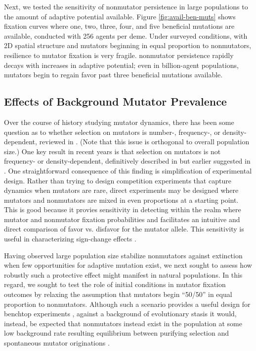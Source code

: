 

Next, we tested the sensitivity of nonmutator persistence in large populations to the amount of adaptive potential available.
Figure \ref{fig:avail-ben-muts} shows fixation curves where one, two, three, four, and five beneficial mutations are available, conducted with 256 agents per deme.
Under surveyed conditions, with 2D spatial structure and mutators beginning in equal proportion to nonmutators, resilience to mutator fixation is very fragile.
nonmutator persistence rapidly decays with increases in adaptive potential;
even in billion-agent populations, mutators begin to regain favor past three beneficial mutations available.



\subsection{Effects of Background Mutator Prevalence}
\label{sec:background-hypermutator-prevalence}

Over the course of history studying mutator dynamics, there has been some question as to whether selection on mutators is number-, frequency-, or density-dependent, reviewed in \citep{raynes2019selection}.
(Note that this issue is orthogonal to overall population size.)
One key result in recent years is that selection on mutators is not frequency- or density-dependent, definitively described in \citep{raynes2019selection} but earlier suggested in \citep{wylie2009fixation}.
One straightforward consequence of this finding is simplification of experimental design.
Rather than trying to design competition experiments that capture dynamics when mutators are rare, direct experiments may be designed where mutators and nonmutators are mixed in even proportions at a starting point.
This is good because it provies sensitivity in detecting within the realm where mutator and nonmutator fixation probabilities and facilitates an intuitive and direct comparison of favor vs. disfavor for the mutator allele.
This sensitivity is useful in characterizing sign-change effects \citep{raynes2018selection}.



Having observed large population size stabilize nonmutators against extinction when few opportunities for adaptive mutation exist, we next sought to assess how robustly such a protective effect might manifest in natural populations.
In this regard, we sought to test the role of initial conditions in mutator fixation outcomes by relaxing the assumption that mutators begin ``50/50'' in equal proportion to nonmutators.
Although such a scenario provides a useful design for benchtop experiments \citep{raynes2018sign}, against a background of evolutionary stasis it would, instead, be expected that nonmutators instead exist in the population at some low background rate resulting equilibrium between purifying selection and spontaneous mutator originations \citep{desai2011balance,johnson1999approach}.

